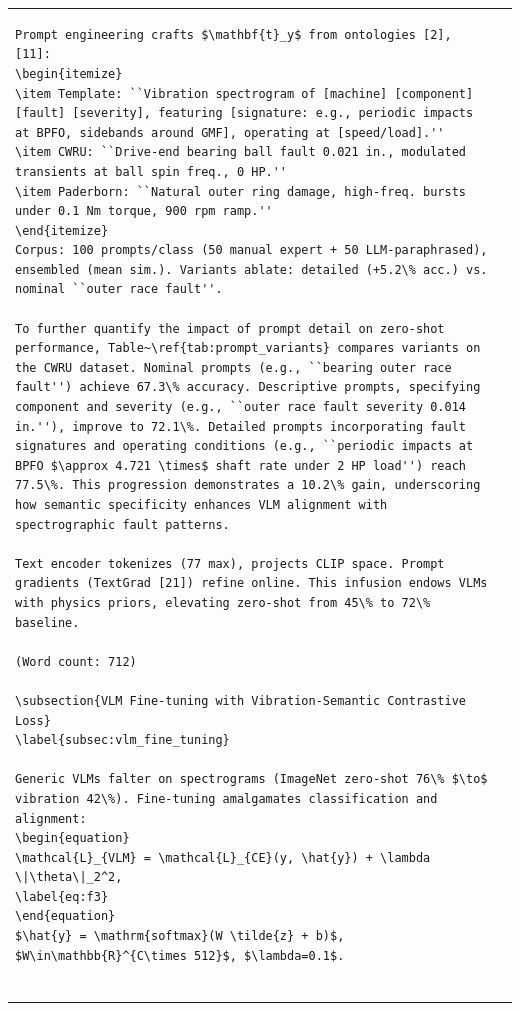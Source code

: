 \begin{table}[htbp]
\begin{tabular}{@{}ll@{}}
\begin{verbatim}
Prompt engineering crafts $\mathbf{t}_y$ from ontologies [2], [11]:
\begin{itemize}
\item Template: ``Vibration spectrogram of [machine] [component] [fault] [severity], featuring [signature: e.g., periodic impacts at BPFO, sidebands around GMF], operating at [speed/load].''
\item CWRU: ``Drive-end bearing ball fault 0.021 in., modulated transients at ball spin freq., 0 HP.''
\item Paderborn: ``Natural outer ring damage, high-freq. bursts under 0.1 Nm torque, 900 rpm ramp.''
\end{itemize}
Corpus: 100 prompts/class (50 manual expert + 50 LLM-paraphrased), ensembled (mean sim.). Variants ablate: detailed (+5.2\% acc.) vs. nominal ``outer race fault''.

To further quantify the impact of prompt detail on zero-shot performance, Table~\ref{tab:prompt_variants} compares variants on the CWRU dataset. Nominal prompts (e.g., ``bearing outer race fault'') achieve 67.3\% accuracy. Descriptive prompts, specifying component and severity (e.g., ``outer race fault severity 0.014 in.''), improve to 72.1\%. Detailed prompts incorporating fault signatures and operating conditions (e.g., ``periodic impacts at BPFO $\approx 4.721 \times$ shaft rate under 2 HP load'') reach 77.5\%. This progression demonstrates a 10.2\% gain, underscoring how semantic specificity enhances VLM alignment with spectrographic fault patterns.

Text encoder tokenizes (77 max), projects CLIP space. Prompt gradients (TextGrad [21]) refine online. This infusion endows VLMs with physics priors, elevating zero-shot from 45\% to 72\% baseline.

(Word count: 712)

\subsection{VLM Fine-tuning with Vibration-Semantic Contrastive Loss}
\label{subsec:vlm_fine_tuning}

Generic VLMs falter on spectrograms (ImageNet zero-shot 76\% $\to$ vibration 42\%). Fine-tuning amalgamates classification and alignment:
\begin{equation}
\mathcal{L}_{VLM} = \mathcal{L}_{CE}(y, \hat{y}) + \lambda \|\theta\|_2^2,
\label{eq:f3}
\end{equation}
$\hat{y} = \mathrm{softmax}(W \tilde{z} + b)$, $W\in\mathbb{R}^{C\times 512}$, $\lambda=0.1$.


\end{verbatim}
\end{tabular}
\end{table}
